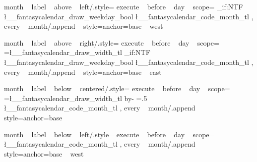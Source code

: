 \tikzset
  {
    month ~ label ~ above ~ left/.style=
      {
        execute ~ before ~ day ~ scope=
          {
              {
                {
                  \bool_if:NTF \l__fantasycalendar_draw_weekday_bool
                    {  }
                    {  }
                  \l__fantasycalendar_code_month_tl%
                }
              } 
          }
        ,
  every ~ month/.append ~ style={anchor=base ~ west}
}}



\tikzset
  {
    month ~ label ~ above ~ right/.style=
      {
        execute ~ before ~ day ~ scope=
          {
              {
                {
                  \pgf@xb=\l__fantasycalendar_draw_width_tl\pgf@xa%
                  \pgftransformxshift{\pgf@xb}%
                  \bool_if:NTF \l__fantasycalendar_draw_weekday_bool
                    {  }
                    {  }
                  \l__fantasycalendar_code_month_tl%
                }
              } 
          }
        ,
  every ~ month/.append ~ style={anchor=base ~ east}
}}

\tikzset
  {
    month ~ label ~ below ~ centered/.style=
      {
        execute ~ before ~ day ~ scope=
          {
              {
                {
                  \pgf@xb=\l__fantasycalendar_draw_width_tl\pgf@xa%
                  \advance\pgf@xb by-\pgf@xa%
                  \pgf@xb=.5\pgf@xb%
                  \pgftransformxshift{\pgf@xb}%
                  \pgftransformxshift{-1.5ex}%
                  \l__fantasycalendar_code_month_tl%
                }
              } 
          }
        ,
  every ~ month/.append ~ style={anchor=base}
}}

\tikzset
  {
    month ~ label ~ below ~ left/.style=
      {
        execute ~ before ~ day ~ scope=
          {
              {
                {
                  \l__fantasycalendar_code_month_tl%
                }
              }
          }
        ,
  every ~ month/.append ~ style={anchor=base ~ west}
}}










